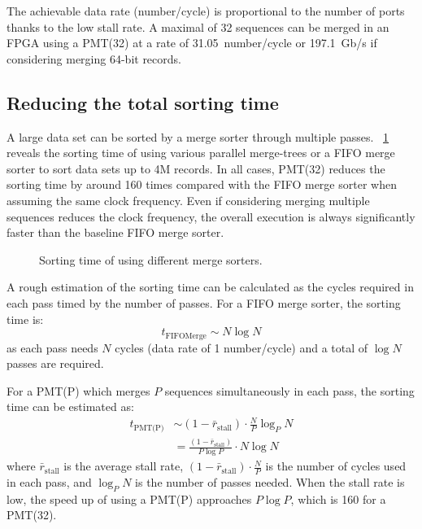 \documentclass[10pt, conference]{IEEEtran}
\begin{document}
The achievable data rate (number/cycle) is proportional to the number of ports thanks to the low stall rate.
A maximal of 32 sequences can be merged in an FPGA using a PMT(32) at a rate of 31.05~number/cycle or 197.1~Gb/s if considering merging 64-bit records.

\subsection{Reducing the total sorting time}

A large data set can be sorted by a merge sorter through multiple passes.
\figurename~\ref{fig_sorter_time} reveals the sorting time of using various parallel merge-trees or a FIFO merge sorter to sort data sets up to 4M records.
In all cases, PMT(32) reduces the sorting time by around 160 times compared with the FIFO merge sorter when assuming the same clock frequency.
Even if considering merging multiple sequences reduces the clock frequency, the overall execution is always significantly faster than the baseline FIFO merge sorter.

\begin{figure}[bt]
\caption{Sorting time of using different merge sorters.}\label{fig_sorter_time}
\end{figure}

A rough estimation of the sorting time can be calculated as the cycles required in each pass timed by the number of passes.
For a FIFO merge sorter, the sorting time is:
\begin{equation}
t_{\text{FIFOMerge}} \sim N \log N
\end{equation}
as each pass needs $N$ cycles (data rate of 1 number/cycle) and a total of $\log N$ passes are required.

For a PMT(P) which merges $P$ sequences simultaneously in each pass, the sorting time can be estimated as:
 \begin{align}
t_{\text{PMT(P)}} 
&\sim (1 - \bar r_{\text{stall}}) \cdot \frac{N}{P} \log_{P} N \\
&= \frac{(1 - \bar r_{\text{stall}})}{P \log P}\cdot N \log N
\end{align}
where $\bar r_{\text{stall}}$ is the average stall rate, $(1 - \bar r_{\text{stall}}) \cdot \frac{N}{P}$ is the number of cycles used in each pass, and $\log_{P} N$ is the number of passes needed.
When the stall rate is low, the speed up of using a PMT(P) approaches $P \log P$, which is 160 for a PMT(32).
\end{document}
